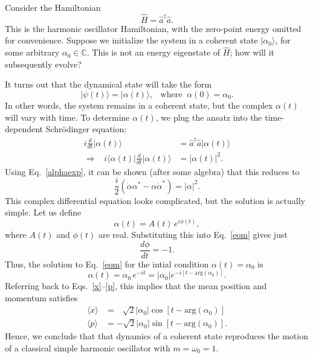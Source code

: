 \documentclass[pra,12pt]{revtex4}
\begin{document}
Consider the Hamiltonian
\begin{equation}
  \hat{H} = \hat{a}^\dagger \hat{a}.
\end{equation}
This is the harmonic oscillator Hamiltonian, with the zero-point
energy omitted for convenience.  Suppose we initialize the system in a
coherent state $|\alpha_0\rangle$, for some arbitrary $\alpha_0 \in
\mathbb{C}$.  This is not an energy eigenstate of $\hat{H}$; how will
it subsequently evolve?

It turns out that the dynamical state will take the form
\begin{equation}
  |\psi(t)\rangle = |\alpha(t)\rangle, \;\;\;\mathrm{where}\;\;\alpha(0) = \alpha_0.
\end{equation}
In other words, the system remains in a coherent state, but the
complex $\alpha(t)$ will vary with time.  To determine $\alpha(t)$, we
plug the ansatz into the time-dependent Schr\"odinger equation:
\begin{align}
  i \frac{d}{dt} |\alpha(t)\rangle &= \hat{a}^\dagger \hat{a} |\alpha(t)\rangle\\
  \Rightarrow \;\;\;
  i \Big\langle\alpha(t)\Big| \frac{d}{dt} \Big|\alpha(t)\Big\rangle &=
  |\alpha(t)|^2.
\end{align}
Using Eq.~\eqref{alphaexp}, it can be shown (after some algebra) that
this reduces to
\begin{equation}
  \frac{i}{2}\left(\dot{\alpha}\alpha^* - \alpha\dot{\alpha}^*\right) = |\alpha|^2.
  \label{eom}
\end{equation}
This complex differential equation looks complicated, but the solution
is actually simple.  Let us define
\begin{equation}
  \alpha(t) = A(t) \, e^{i\phi(t)},
\end{equation}
where $A(t)$ and $\phi(t)$ are real.  Substituting this into
Eq.~\eqref{eom} gives just
\begin{equation}
  \frac{d\phi}{dt} = -1.
\end{equation}
Thus, the solution to Eq.~\eqref{eom} for the intial condition
$\alpha(t) = \alpha_0$ is
\begin{equation}
  \alpha(t) = \alpha_0 \, e^{-it} = |\alpha_0| e^{-i[t - \mathrm{arg}(\alpha_0)]}.
\end{equation}
Referring back to Eqs.~\eqref{x}--\eqref{p}, this implies that the
mean position and momentum satisfies
\begin{align}
  \langle x\rangle &=\, \;\;\sqrt{2} |\alpha_0| \cos\left[t - \mathrm{arg}(\alpha_0)\right] \\
  \langle p\rangle &= -\sqrt{2} |\alpha_0| \sin\left[t - \mathrm{arg}(\alpha_0)\right].
\end{align}
Hence, we conclude that that dynamics of a coherent state reproduces
the motion of a classical simple harmonic oscillator with $m =
\omega_0 = 1$.
\end{document}
